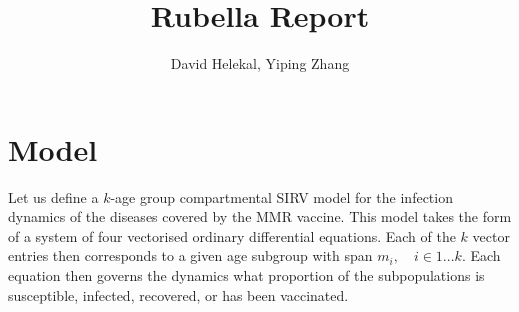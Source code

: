 \documentclass{article}
\title{Rubella Report}
\author{David Helekal, Yiping Zhang}
\theoremstyle{definition}
\begin{document}
\maketitle
\section{Model}

Let us define a $k$-age group compartmental SIRV model for the infection dynamics of the diseases covered by the MMR vaccine. This model takes the form of a system of four vectorised ordinary differential equations. Each of the $k$ vector entries then corresponds to a given age subgroup with span $m_i, \quad i\in1...k$. Each equation then governs the dynamics what proportion of the subpopulations is susceptible, infected, recovered, or has been vaccinated.
\end{document}
